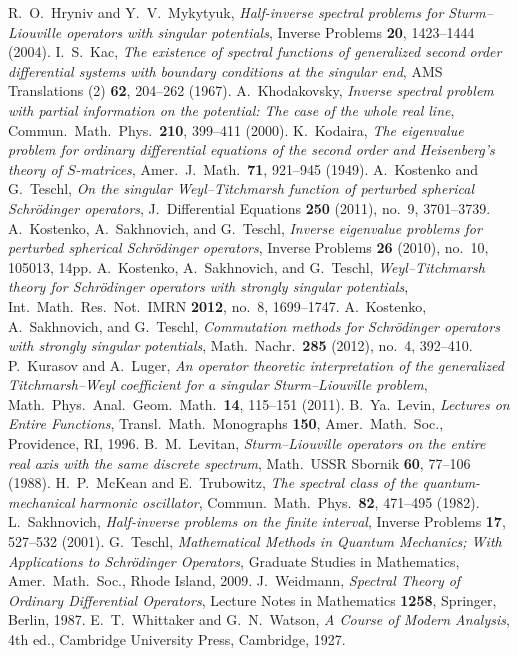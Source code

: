 \documentclass{amsart}
\numberwithin{equation}{section}
\begin{document}
\begin{thebibliography}{XX}
R.\ O.\ Hryniv and Y.\ V.\ Mykytyuk, {\em Half-inverse spectral problems for Sturm--Liouville operators with singular potentials}, Inverse Problems {\bf 20}, 1423--1444 (2004).
I.\ S.\ Kac, {\em The existence of spectral functions of generalized second order differential systems with boundary conditions at the singular end}, AMS Translations (2) {\bf 62}, 204--262 (1967).
A.\ Khodakovsky, {\em Inverse spectral problem with partial information on the potential: The case of the whole real line}, Commun.\ Math.\ Phys.\ {\bf 210}, 399--411 (2000).
K.\ Kodaira, {\em The eigenvalue problem for ordinary differential equations of the second order and Heisenberg's theory of $S$-matrices}, Amer.\ J.\ Math.\ {\bf 71}, 921--945 (1949).
A.\ Kostenko and G.\ Teschl, {\em On the singular Weyl--Titchmarsh function of
perturbed spherical Schr\"odinger operators}, J.\ Differential Equations  {\bf 250} (2011), no.~9, 3701--3739.
A.\ Kostenko, A.\ Sakhnovich, and G.\ Teschl, {\em Inverse eigenvalue problems for perturbed spherical Schr\"odinger operators},
Inverse Problems {\bf 26} (2010), no.~10, 105013, 14pp.
A.\ Kostenko, A.\ Sakhnovich, and G.\ Teschl, {\em Weyl--Titchmarsh theory for Schr\"odinger operators with strongly singular potentials},
Int.\ Math.\ Res.\ Not.\ IMRN {\bf 2012}, no.~8, 1699--1747.
A.\ Kostenko, A.\ Sakhnovich, and G.\ Teschl, {\em Commutation methods for Schr\"odinger operators with strongly singular potentials}, Math.\ Nachr.\ {\bf 285} (2012), no.~4, 392--410.
P.\ Kurasov and A.\ Luger, {\em An operator theoretic interpretation of the generalized Titchmarsh--Weyl coefficient for a singular Sturm--Liouville problem},
Math.\ Phys.\ Anal.\ Geom.\ Math.\ {\bf 14}, 115--151 (2011).
B.\ Ya.\ Levin, {\em Lectures on Entire Functions}, Transl.\ Math.\ Monographs {\bf 150}, Amer.\ Math.\ Soc., Providence, RI, 1996.
B.\ M.\ Levitan, {\em Sturm--Liouville operators on the entire real axis with the same discrete spectrum}, Math.\ USSR Sbornik {\bf 60}, 77--106 (1988).
H.\ P.\ McKean and E.\ Trubowitz, {\em The spectral class of the quantum-mechanical harmonic oscillator}, Commun.\ Math.\ Phys.\ {\bf 82}, 471--495 (1982).
L.\ Sakhnovich, {\em Half-inverse problems on the finite interval}, Inverse Problems {\bf 17}, 527--532 (2001).
G.\ Teschl, {\em Mathematical Methods in Quantum Mechanics; With Applications to Schr\"odinger Operators},
Graduate Studies in Mathematics, Amer.\ Math.\ Soc., Rhode Island, 2009.
J.\ Weidmann, {\em Spectral Theory of Ordinary Differential Operators},
Lecture Notes in Mathematics {\bf 1258}, Springer, Berlin, 1987.
 E.\ T.\ Whittaker and G.\ N.\ Watson, {\em A Course of Modern Analysis}, 4th ed.,
Cambridge University Press, Cambridge, 1927.
\end{thebibliography}
\end{document}
